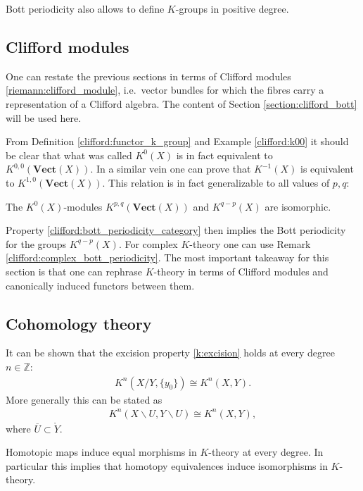 {    \begin{remark}
        Bott periodicity also allows to define $K$-groups in positive degree.
    \end{remark}

\subsection{Clifford modules}

    One can restate the previous sections in terms of Clifford modules \ref{riemann:clifford_module}, i.e.~vector bundles for which the fibres carry a representation of a Clifford algebra. The content of Section \ref{section:clifford_bott} will be used here.

    From Definition \ref{clifford:functor_k_group} and Example \ref{clifford:k00} it should be clear that what was called $K^0(X)$ is in fact equivalent to $K^{0,0}(\mathbf{Vect}(X))$. In a similar vein one can prove that $K^{-1}(X)$ is equivalent to $K^{1,0}(\mathbf{Vect}(X))$. This relation is in fact generalizable to all values of $p,q$:
    \begin{property}
        The $K^0(X)$-modules $K^{p,q}(\mathbf{Vect}(X))$ and $K^{q-p}(X)$ are isomorphic.
    \end{property}

    Property \ref{clifford:bott_periodicity_category} then implies the Bott periodicity for the groups $K^{q-p}(X)$. For complex $K$-theory one can use Remark \ref{clifford:complex_bott_periodicity}. The most important takeaway for this section is that one can rephrase $K$-theory in terms of Clifford modules and canonically induced functors between them.

\subsection{Cohomology theory}

    \begin{property}[Excision]
        It can be shown that the excision property \ref{k:excision} holds at every degree $n\in\mathbb{Z}$:
        \begin{gather}
            K^n(X/Y,\{y_0\})\cong K^n(X,Y).
        \end{gather}
        More generally this can be stated as
        \begin{gather}
            K^n(X\backslash U,Y\backslash U)\cong K^n(X,Y),
        \end{gather}
        where $\overline{U}\subset\mathring{Y}$.
    \end{property}
    \begin{property}
        Homotopic maps induce equal morphisms in $K$-theory at every degree. In particular this implies that homotopy equivalences induce isomorphisms in $K$-theory.
    \end{property}

}
